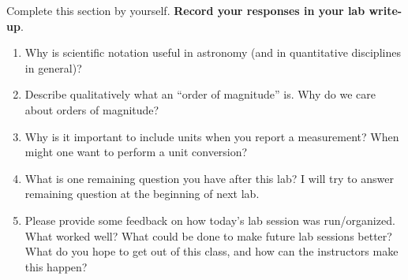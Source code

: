 \documentclass[11pt]{article}
\begin{document}
Complete this section by yourself. \textbf{Record your responses in your lab write-up}. 
\begin{enumerate}
    \item Why is scientific notation useful in astronomy (and in quantitative disciplines in general)?
    
    \item Describe qualitatively what an ``order of magnitude'' is. Why do we care about orders of magnitude?
    
    \item Why is it important to include units when you report a measurement? When might one want to perform a unit conversion?
    
    \item What is one remaining question you have after this lab?  I will try to answer remaining question at the beginning of next lab. 
    
    \item Please provide some feedback on how today's lab session was run/organized. What worked well? What could be done to make future lab sessions better? What do you hope to get out of this class, and how can the instructors make this happen?
\end{enumerate}
\end{document}
